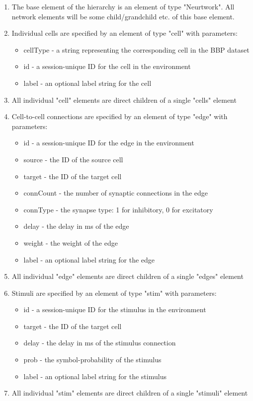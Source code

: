 \begin{enumerate}
    \item The base element of the hierarchy is an element of type "Neurtwork". All network elements will be some child/grandchild etc. of this base element.
    \item Individual cells are specified by an element of type "cell" with parameters:
    \begin{itemize}
        \item cellType - a string representing the corresponding cell in the BBP dataset
        \item id - a session-unique ID for the cell in the environment
        \item label - an optional label string for the cell
    \end{itemize}
    \item All individual "cell" elements are direct children of a single "cells" element
    
    \item Cell-to-cell connections are specified by an element of type "edge" with parameters:
    \begin{itemize}
        \item id - a session-unique ID for the edge in the environment
        \item source - the ID of the source cell
        \item target - the ID of the target cell
        \item connCount - the number of synaptic connections in the edge
        \item connType - the synapse type: 1 for inhibitory, 0 for excitatory
        \item delay - the delay in ms of the edge
        \item weight - the weight of the edge
        \item label - an optional label string for the edge
    \end{itemize}
    \item All individual "edge" elements are direct children of a single "edges" element
    
    \item Stimuli are specified by an element of type "stim" with parameters:
    \begin{itemize}
        \item id - a session-unique ID for the stimulus in the environment
        \item target - the ID of the target cell
        \item delay - the delay in ms of the stimulus connection
        \item prob - the symbol-probability of the stimulus
        \item label - an optional label string for the stimulus
    \end{itemize}
    \item All individual "stim" elements are direct children of a single "stimuli" element
    

\end{enumerate}
